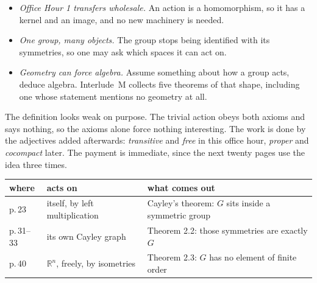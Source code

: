 \documentclass[10pt]{article}
\newcommand{\R}{\mathbb{R}}
\begin{document}
{\begin{minipage}[t]{744pt}
\begin{bigpic}
\begin{minipage}[t]{352pt}
\begin{itemize}[nosep,leftmargin=1.2em,topsep=2pt]
\item \emph{Office Hour 1 transfers wholesale.} An action is a homomorphism, so it has a kernel and an image, and no new machinery is needed.
\item \emph{One group, many objects.} The group stops being identified with its symmetries, so one may ask which spaces it can act on.
\item \emph{Geometry can force algebra.} Assume something about how a group acts, deduce algebra. Interlude~M collects five theorems of that shape, including one whose statement mentions no geometry at all.
\end{itemize}
\end{minipage}\hfill
\begin{minipage}[t]{360pt}\vspace{0pt}
The definition looks weak on purpose. The trivial action obeys both axioms and says nothing, so the axioms alone force nothing interesting. The work is done by the adjectives added afterwards: \emph{transitive} and \emph{free} in this office hour, \emph{proper} and \emph{cocompact} later. The payment is immediate, since the next twenty pages use the idea three times.\par\vspace{4pt}
\centering\small
\begin{tabular}{@{}lll@{}}
\toprule
where & acts on & what comes out\\
\midrule
p.\,23 & itself, by left multiplication & Cayley's theorem: $G$ sits inside a symmetric group\\
p.\,31--33 & its own Cayley graph & Theorem 2.2: those symmetries are exactly $G$\\
p.\,40 & $\R^n$, freely, by isometries & Theorem 2.3: $G$ has no element of finite order\\
\bottomrule
\end{tabular}
\end{minipage}
\end{bigpic}
\end{minipage}
}
\end{document}
